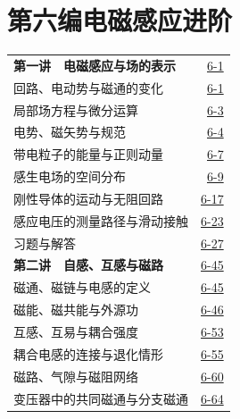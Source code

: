 \section*{第六编\quad 电磁感应进阶}
\begin{longtable}{@{}p{}r@{}}
\textbf{第一讲　电磁感应与场的表示}&\href{course-page:6:4}{6-1}\\[2pt]
\hspace{1em}回路、电动势与磁通的变化&\href{course-page:6:4}{6-1}\\[2pt]
\hspace{1em}局部场方程与微分运算&\href{course-page:6:6}{6-3}\\[2pt]
\hspace{1em}电势、磁矢势与规范&\href{course-page:6:7}{6-4}\\[2pt]
\hspace{1em}带电粒子的能量与正则动量&\href{course-page:6:10}{6-7}\\[2pt]
\hspace{1em}感生电场的空间分布&\href{course-page:6:12}{6-9}\\[2pt]
\hspace{1em}刚性导体的运动与无阻回路&\href{course-page:6:20}{6-17}\\[2pt]
\hspace{1em}感应电压的测量路径与滑动接触&\href{course-page:6:26}{6-23}\\[2pt]
\hspace{1em}习题与解答&\href{course-page:6:30}{6-27}\\[2pt]
\textbf{第二讲　自感、互感与磁路}&\href{course-page:6:48}{6-45}\\[2pt]
\hspace{1em}磁通、磁链与电感的定义&\href{course-page:6:48}{6-45}\\[2pt]
\hspace{1em}磁能、磁共能与外源功&\href{course-page:6:49}{6-46}\\[2pt]
\hspace{1em}互感、互易与耦合强度&\href{course-page:6:56}{6-53}\\[2pt]
\hspace{1em}耦合电感的连接与退化情形&\href{course-page:6:58}{6-55}\\[2pt]
\hspace{1em}磁路、气隙与磁阻网络&\href{course-page:6:63}{6-60}\\[2pt]
\hspace{1em}变压器中的共同磁通与分支磁通&\href{course-page:6:67}{6-64}\\[2pt]

\end{longtable}
